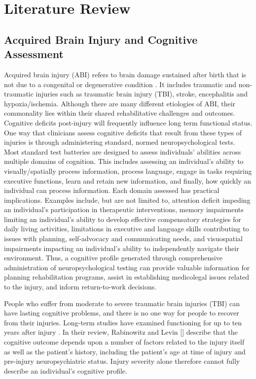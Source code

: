 
\chapter{Literature Review}\label{Chapter2}


\section{Acquired Brain Injury and Cognitive Assessment}
Acquired brain injury (ABI) refers to brain damage sustained after birth that is not due to a congenital or degenerative condition \parencite{ukdhsc2022abi}. It includes traumatic and non-traumatic injuries such as traumatic brain injury (TBI), stroke, encephalitis and hypoxia/ischemia. Although there are many different etiologies of ABI, their commonality lies within their shared rehabilitative challenges and outcomes. Cognitive deficits post-injury will frequently influence long term functional status. One way that clinicians assess cognitive deficits that result from these types of injuries is through administering standard, normed neuropsychological tests. Most standard test batteries are designed to assess individuals' abilities across multiple domains of cognition. This includes assessing an individual's ability to visually/spatially process information, process language, engage in tasks requiring executive functions, learn and retain new information, and finally, how quickly an individual can process information. Each domain assessed has practical implications. Examples include, but are not limited to, attention deficit impeding an individual's participation in therapeutic interventions, memory impairments limiting an individual's ability to develop effective compensatory strategies for daily living activities, limitations in executive and language skills contributing to issues with planning, self-advocacy and communicating needs, and visuospatial impairments impacting an individual's ability to independently navigate their environment. Thus, a cognitive profile generated through comprehensive administration of neuropsychological testing can provide valuable information for planning rehabilitation programs, assist in establishing medicolegal issues related to the injury, and inform return-to-work decisions.

People who suffer from moderate to severe traumatic brain injuries (TBI) can have lasting cognitive problems, and there is no one way for people to recover from their injuries. Long-term studies have examined functioning for up to ten years after injury \parencite{ponsford2014longitudinal}. In their review, Rabinowitz and Levin [\citeyear{rabinowitz2014neuropsychological}] describe that the cognitive outcome depends upon a number of factors related to the injury itself as well as the patient's history, including the patient's age at time of injury and pre-injury neuropsychiatric status. Injury severity alone therefore cannot fully describe an individual's cognitive profile.

